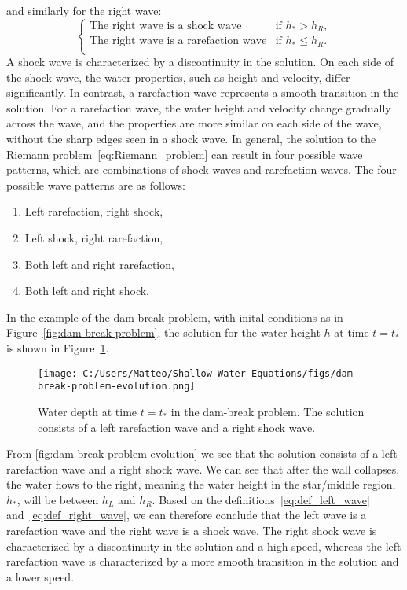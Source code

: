 and similarly for the right wave:
\begin{equation}\label{eq:def_right_wave}
    \begin{cases}
        \text{The right wave is a shock wave} & \text{if } h_* > h_R, \\
        \text{The right wave is a rarefaction wave} & \text{if } h_* \leq h_R. \\        
    \end{cases} 
\end{equation}
A shock wave is characterized by a discontinuity in the solution.
On each side of the shock wave, the water properties, such as height and velocity, differ significantly.
In contrast, a rarefaction wave represents a smooth transition in the solution.
For a rarefaction wave, the water height and velocity change gradually across the wave, and the properties are more similar on each side of the wave, without the sharp edges seen in a shock wave.
In general, the solution to the Riemann problem~\eqref{eq:Riemann_problem} can result in four possible wave patterns, which are combinations of shock waves and rarefaction waves.
The four possible wave patterns are as follows:
\begin{enumerate}[label= (\alph*)]
    \item Left rarefaction, right shock,
    \item Left shock, right rarefaction,
    \item Both left and right rarefaction,
    \item Both left and right shock.
\end{enumerate}
In the example of the dam-break problem, with inital conditions as in Figure~\ref{fig:dam-break-problem}, the solution for the water height $h$ at time $t = t_*$ is shown in Figure~\ref{fig:dam-break-problem-evolution}.
\begin{figure}[H]
    \centering
    \texttt{[image: C:/Users/Matteo/Shallow-Water-Equations/figs/dam-break-problem-evolution.png]}
    \caption{Water depth at time $t = t_*$ in the dam-break problem. The solution consists of a left rarefaction wave and a right shock wave.}\label{fig:dam-break-problem-evolution}
\end{figure}
From \autoref{fig:dam-break-problem-evolution} we see that the solution consists of a left rarefaction wave and a right shock wave.
We can see that after the wall collapses, the water flows to the right, meaning the water height in the star/middle region, $h_*$, will be between $h_L$ and $h_R$.
Based on the definitions~\eqref{eq:def_left_wave} and~\eqref{eq:def_right_wave}, we can therefore conclude that the left wave is a rarefaction wave and the right wave is a shock wave.
The right shock wave is characterized by a discontinuity in the solution and a high speed, whereas the left rarefaction wave is characterized by a more smooth transition in the solution and a lower speed.

